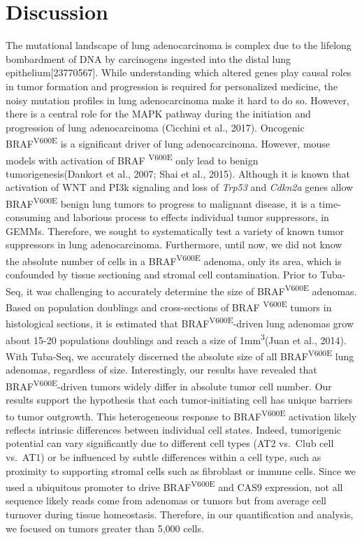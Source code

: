 \hypertarget{discussion}{%
\section{Discussion}\label{discussion}}

The mutational landscape of lung adenocarcinoma is complex due to the lifelong bombardment of DNA by carcinogens ingested into the distal lung epithelium{[}23770567{]}.
While understanding which altered genes play causal roles in tumor formation and progression is required for personalized medicine, the noisy mutation profiles in lung adenocarcinoma make it hard to do so.
However, there is a central role for the MAPK pathway during the initiation and progression of lung adenocarcinoma (Cicchini et al., 2017).
Oncogenic BRAF\textsuperscript{V600E} is a significant driver of lung adenocarcinoma.
However, mouse models with activation of BRAF \textsuperscript{V600E} only lead to benign tumorigenesis(Dankort et al., 2007; Shai et al., 2015).
Although it is known that activation of WNT and PI3k signaling and loss of \emph{Trp53} and \emph{Cdkn2a} genes allow BRAF\textsuperscript{V600E} benign lung tumors to progress to malignant disease, it is a time-consuming and laborious process to effects individual tumor suppressors, in GEMMs.
Therefore, we sought to systematically test a variety of known tumor suppressors in lung adenocarcinoma.
Furthermore, until now, we did not know the absolute number of cells in a BRAF\textsuperscript{V600E} adenoma, only its area, which is confounded by tissue sectioning and stromal cell contamination.
Prior to Tuba-Seq, it was challenging to accurately determine the size of BRAF\textsuperscript{V600E} adenomas.
Based on population doublings and cross-sections of BRAF \textsuperscript{V600E} tumors in histological sections, it is estimated that BRAF\textsuperscript{V600E}-driven lung adenomas grow about 15-20 populations doublings and reach a size of 1mm\textsuperscript{3}(Juan et al., 2014).
With Tuba-Seq, we accurately discerned the absolute size of all BRAF\textsuperscript{V600E} lung adenomas, regardless of size.
Interestingly, our results have revealed that BRAF\textsuperscript{V600E}-driven tumors widely differ in absolute tumor cell number. Our results support the hypothesis that each tumor-initiating cell has unique barriers to tumor outgrowth.
This heterogeneous response to BRAF\textsuperscript{V600E} activation likely reflects intrinsic differences between individual cell states.
Indeed, tumorigenic potential can vary significantly due to different cell types (AT2 vs.~Club cell vs.~AT1) or be influenced by subtle differences within a cell type, such as proximity to supporting stromal cells such as fibroblast or immune cells.
Since we used a ubiquitous promoter to drive BRAF\textsuperscript{V600E} and CAS9 expression, not all sequence likely reads come from adenomas or tumors but from average cell turnover during tissue homeostasis.
Therefore, in our quantification and analysis, we focused on tumors greater than 5,000 cells.

